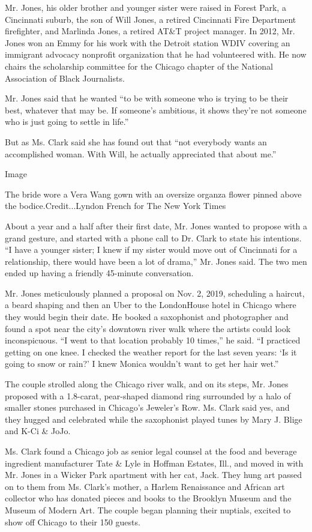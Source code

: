 Mr. Jones, his older brother and younger sister were raised in Forest
Park, a Cincinnati suburb, the son of Will Jones, a retired Cincinnati
Fire Department firefighter, and Marlinda Jones, a retired AT\&T project
manager. In 2012, Mr. Jones won an Emmy for his work with the Detroit
station WDIV covering an immigrant advocacy nonprofit organization that
he had volunteered with. He now chairs the scholarship committee for the
Chicago chapter of the National Association of Black Journalists.

Mr. Jones said that he wanted ``to be with someone who is trying to be
their best, whatever that may be. If someone's ambitious, it shows
they're not someone who is just going to settle in life.''

But as Ms. Clark said she has found out that ``not everybody wants an
accomplished woman. With Will, he actually appreciated that about me.''

Image

The bride wore a Vera Wang gown with an oversize organza flower pinned
above the bodice.Credit...Lyndon French for The New York Times

About a year and a half after their first date, Mr. Jones wanted to
propose with a grand gesture, and started with a phone call to Dr. Clark
to state his intentions. ``I have a younger sister; I knew if my sister
would move out of Cincinnati for a relationship, there would have been a
lot of drama,'' Mr. Jones said. The two men ended up having a friendly
45-minute conversation.

Mr. Jones meticulously planned a proposal on Nov. 2, 2019, scheduling a
haircut, a beard shaping and then an Uber to the LondonHouse hotel in
Chicago where they would begin their date. He booked a saxophonist and
photographer and found a spot near the city's downtown river walk where
the artists could look inconspicuous. ``I went to that location probably
10 times,'' he said. ``I practiced getting on one knee. I checked the
weather report for the last seven years: `Is it going to snow or rain?'
I knew Monica wouldn't want to get her hair wet.''

The couple strolled along the Chicago river walk, and on its steps, Mr.
Jones proposed with a 1.8-carat, pear-shaped diamond ring surrounded by
a halo of smaller stones purchased in Chicago's Jeweler's Row. Ms. Clark
said yes, and they hugged and celebrated while the saxophonist played
tunes by Mary J. Blige and K-Ci \& JoJo.

Ms. Clark found a Chicago job as senior legal counsel at the food and
beverage ingredient manufacturer Tate \& Lyle in Hoffman Estates, Ill.,
and moved in with Mr. Jones in a Wicker Park apartment with her cat,
Jack. They hung art passed on to them from Ms. Clark's mother, a Harlem
Renaissance and African art collector who has donated pieces and books
to the Brooklyn Museum and the Museum of Modern Art. The couple began
planning their nuptials, excited to show off Chicago to their 150
guests.

